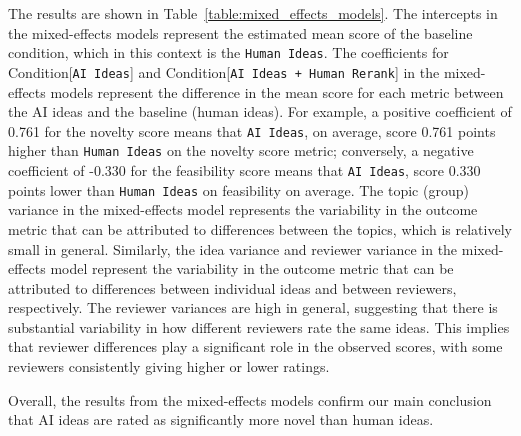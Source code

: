 The results are shown in Table~\ref{table:mixed_effects_models}. 
The intercepts in the mixed-effects models represent the estimated mean score of the baseline condition, which in this context is the \texttt{Human Ideas}. 
The coefficients for Condition[\texttt{AI Ideas}] and Condition[\texttt{AI Ideas + Human Rerank}] in the mixed-effects models represent the difference in the mean score for each metric between the AI ideas and the baseline (human ideas). For example, a positive coefficient of 0.761 for the novelty score means that \texttt{AI Ideas}, on average, score 0.761 points higher than \texttt{Human Ideas} on the novelty score metric; conversely, a negative coefficient of -0.330 for the feasibility score means that  \texttt{AI Ideas}, score 0.330 points lower than \texttt{Human Ideas} on feasibility on average. 
The topic (group) variance in the mixed-effects model represents the variability in the outcome metric that can be attributed to differences between the topics, which is relatively small in general. 
Similarly, the idea variance and reviewer variance in the mixed-effects model represent the variability in the outcome metric that can be attributed to differences between individual ideas and between reviewers, respectively. 
The reviewer variances are high in general, suggesting that there is substantial variability in how different reviewers rate the same ideas. This implies that reviewer differences play a significant role in the observed scores, with some reviewers consistently giving higher or lower ratings.

Overall, the results from the mixed-effects models confirm our main conclusion that AI ideas are rated as significantly more novel than human ideas. 

\newpage 





